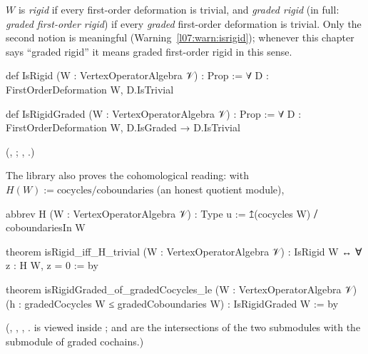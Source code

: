 \begin{definition}[Rigidity]\label{l07:def:rigid}
$W$ is \emph{rigid} if every first-order deformation is trivial, and \emph{graded rigid} (in full:
\emph{graded first-order rigid}) if every \emph{graded} first-order deformation is trivial. Only the second
notion is meaningful (Warning~\ref{l07:warn:isrigid}); whenever this chapter says ``graded rigid'' it means
graded first-order rigid in this sense.
\end{definition}
\begin{leancode}
def IsRigid (W : VertexOperatorAlgebra 𝒱) : Prop :=
  ∀ D : FirstOrderDeformation W, D.IsTrivial

def IsRigidGraded (W : VertexOperatorAlgebra 𝒱) : Prop :=
  ∀ D : FirstOrderDeformation W, D.IsGraded → D.IsTrivial
\end{leancode}
(, ;
, .)

The library also proves the cohomological reading: with $H(W) := \mathrm{cocycles}/\mathrm{coboundaries}$
(an honest quotient module),
\begin{leancode}
abbrev H (W : VertexOperatorAlgebra 𝒱) : Type u := ↥(cocycles W) ⧸ coboundariesIn W

theorem isRigid_iff_H_trivial (W : VertexOperatorAlgebra 𝒱) :
    IsRigid W ↔ ∀ z : H W, z = 0 := by

theorem isRigidGraded_of_gradedCocycles_le (W : VertexOperatorAlgebra 𝒱)
    (h : gradedCocycles W ≤ gradedCoboundaries W) : IsRigidGraded W := by
\end{leancode}
(, ,
, .
 is  viewed inside ;
 and  are the intersections of the two submodules with
the submodule  of graded cochains.)

